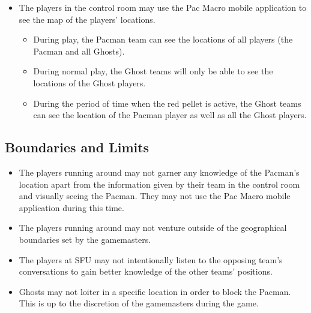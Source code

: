 \documentclass[10pt, oneside, letterpaper, titlepage]{article}
\begin{document}
	\begin{itemize}
		\item The players in the control room may use the Pac Macro mobile application to see the map of the players' locations.
		\begin{itemize}
			\item During play, the Pacman team can see the locations of all players (the Pacman and all Ghosts).
			\item During normal play, the Ghost teams will only be able to see the locations of the Ghost players.
			\item During the period of time when the red pellet is active, the Ghost teams can see the location of the Pacman player as well as all the Ghost players.
		\end{itemize}
	\end{itemize}

	\subsection{Boundaries and Limits}
	\label{subsec:gameplay:boundaries-and-limits}

	\begin{itemize}
		\item The players running around may not garner any knowledge of the Pacman's location apart from the information given by their team in the control room and visually seeing the Pacman. They may not use the Pac Macro mobile application during this time.
		\item The players running around may not venture outside of the geographical boundaries set by the gamemasters.
		\item The players at SFU may not intentionally listen to the opposing team's conversations to gain better knowledge of the other teams' positions.
		\item Ghosts may not loiter in a specific location in order to block the Pacman. This is up to the discretion of the gamemasters during the game.
	\end{itemize}
\end{document}
